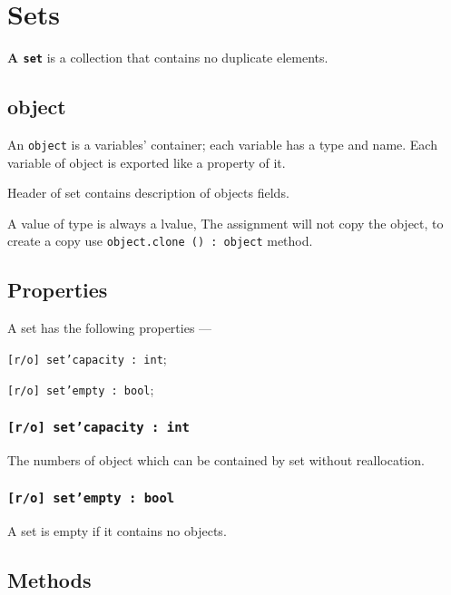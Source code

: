 \section{Sets}

{\bf A \texttt{set}} is a collection that contains no duplicate elements.

\subsection{{\color{lightblue} object}}

An \texttt{object} is a variables' container; each variable has a type and name. Each variable of object is exported like a property of it.

Header of set contains description of objects fields.

A value of type \object{} is always a lvalue, The assignment will not copy the object, to create a copy use \texttt{object.clone () : object} method.

\subsection{Properties}

A set has the following properties —
\begin{icItems}
\item \texttt{[r/o] set'capacity : int};
\item \texttt{[r/o] set'empty : bool};
\end{icItems}

\subsubsection{\texttt{[r/o] set'capacity : int}}

The numbers of object which can be contained by set without reallocation.

\subsubsection{\texttt{[r/o] set'empty : bool}}

A set is empty if it contains no objects.

\subsection{Methods}

